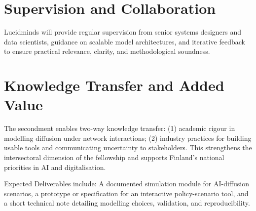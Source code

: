 \documentclass{nfr}
\begin{document}
\section*{Supervision and Collaboration}

Lucidminds will provide regular supervision from senior systems designers and data scientists, guidance on scalable model architectures, and iterative feedback to ensure practical relevance, clarity, and methodological soundness.

\section*{Knowledge Transfer and Added Value}

The secondment enables two-way knowledge transfer:  
(1) academic rigour in modelling diffusion under network interactions;  
(2) industry practices for building usable tools and communicating uncertainty to stakeholders.  
This strengthens the intersectoral dimension of the fellowship and supports Finland’s national priorities in AI and digitalisation.

Expected Deliverables include: A documented simulation module for AI-diffusion scenarios, a prototype or specification for an interactive policy-scenario tool, and a short technical note detailing modelling choices, validation, and reproducibility.
\end{document}
